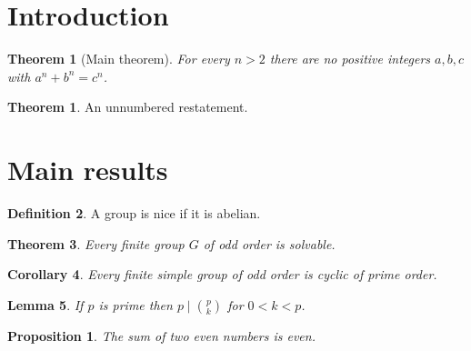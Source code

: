 \documentclass{amsart}
\newtheorem{theorem}{Theorem}[section]
\newtheorem{lemma}[theorem]{Lemma}
\newtheorem{corollary}[theorem]{Corollary}
\newtheorem{proposition}{Proposition}
\theoremstyle{definition}
\newtheorem{definition}[theorem]{Definition}
\newtheorem*{theorem*}{Theorem}
\begin{document}
\begin{abstract}
We prove Theorem~\ref{thm:main}. %
\end{abstract}
\section{Introduction}
\begin{theorem}[Main theorem]\label{thm:intro}
For every $n > 2$ there are no positive integers $a,b,c$ with $a^n + b^n = c^n$.
\end{theorem}
\begin{theorem*}
An unnumbered restatement.
\end{theorem*}

\section{Main results}
\begin{definition}\label{def:nice}
A group is nice if it is abelian.
\end{definition}
\begin{theorem}\label{thm:main}
Every finite group $G$ of odd order is solvable.
\end{theorem}
\begin{corollary}\label{cor:simple}
Every finite simple group of odd order is cyclic of prime order.
\end{corollary}
\begin{lemma}
If $p$ is prime then $p \mid \binom{p}{k}$ for $0<k<p$.
\end{lemma}
\begin{proposition}\label{prop:sorry}
The sum of two even numbers is even.
\end{proposition}
\end{document}
